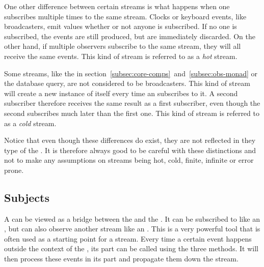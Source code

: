 
One other difference between certain streams is what happens when one subscribes multiple times to the same stream. Clocks or keyboard events, like broadcasters, emit values whether or not anyone is subscribed. If no one is subscribed, the events are still produced, but are immediately discarded. On the other hand, if multiple observers subscribe to the same stream, they will all receive the same events. This kind of stream is referred to as a \textit{hot} stream.

Some streams, like the  in section~\ref{subsec:core-comps}~and~\ref{subsec:obs-monad} or the database query, are not considered to be broadcasters. This kind of stream will create a new instance of itself every time an \obv subscribes to it. A second subscriber therefore receives the same result as a first subscriber, even though the second subscribes much later than the first one. This kind of stream is referred to as a \textit{cold} stream.


Notice that even though these differences do exist, they are not reflected in they type of the \obs. It is therefore always good to be careful with these distinctions and not to make any assumptions on streams being hot, cold, finite, infinite or error prone.

\subsection{Subjects}
\label{subsec:subjects}
A \subj can be viewed as a bridge between the \obv and the \obs. It can be subscribed to like an \obs, but can also observe another stream like an \obv. This is a very powerful tool that is often used as a starting point for a stream. Every time a certain event happens outside the context of the \subj, its \obv part can be called using the three methods. It will then process these events in its \obs part and propagate them down the stream.

